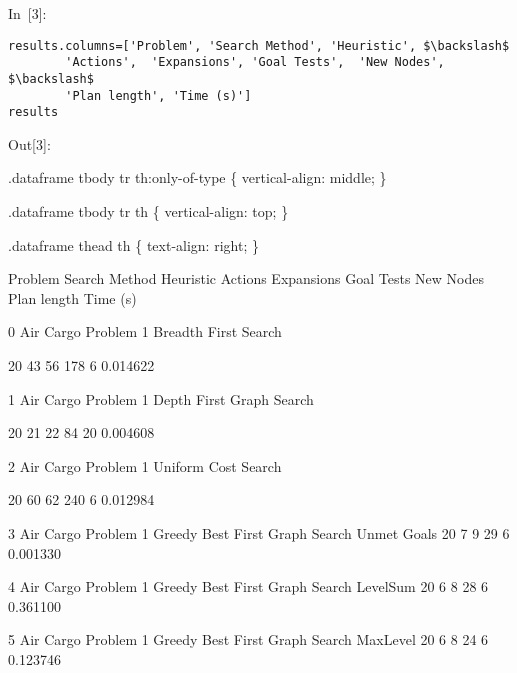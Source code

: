 \documentclass{article}
\begin{document}
In~[3]:

    
\begin{verbatim}results.columns=['Problem', 'Search Method', 'Heuristic', $\backslash$
        'Actions',  'Expansions', 'Goal Tests',  'New Nodes', $\backslash$
        'Plan length', 'Time (s)']
results
\end{verbatim}











Out[3]:






    .dataframe tbody tr th:only-of-type \{
        vertical-align: middle;
    \}

    .dataframe tbody tr th \{
        vertical-align: top;
    \}

    .dataframe thead th \{
        text-align: right;
    \}


  
    
      
      Problem
      Search Method
      Heuristic
      Actions
      Expansions
      Goal Tests
      New Nodes
      Plan length
      Time (s)
    
  
  
    
      0
      Air Cargo Problem 1
      Breadth First Search
      
      20
      43
      56
      178
      6
      0.014622
    
    
      1
      Air Cargo Problem 1
      Depth First Graph Search
      
      20
      21
      22
      84
      20
      0.004608
    
    
      2
      Air Cargo Problem 1
      Uniform Cost Search
      
      20
      60
      62
      240
      6
      0.012984
    
    
      3
      Air Cargo Problem 1
      Greedy Best First Graph Search
      Unmet Goals
      20
      7
      9
      29
      6
      0.001330
    
    
      4
      Air Cargo Problem 1
      Greedy Best First Graph Search
      LevelSum
      20
      6
      8
      28
      6
      0.361100
    
    
      5
      Air Cargo Problem 1
      Greedy Best First Graph Search
      MaxLevel
      20
      6
      8
      24
      6
      0.123746
    
\end{document}
